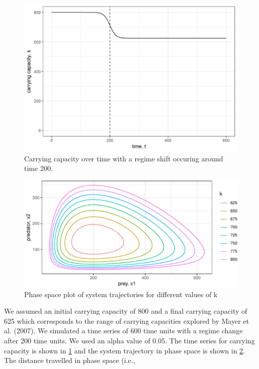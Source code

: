 \documentclass[12pt,twoside,openany]{reedthesis}
\begin{document}
\begin{figure}

{\centering \includegraphics[width=0.85\linewidth]{./chapterFiles/fiGuide/figures/kByTime} 

}

\caption{Carrying capacity over time with a regime shift occuring around time 200.}\label{fig:kByTime}
\end{figure}\begin{figure}
{\centering \includegraphics[width=0.85\linewidth]{_myDissertation_files/figure-latex/kTrajectories-1} 

}

\caption{Phase space plot of system trajectories for different values of k}\label{fig:kTrajectories}
\end{figure}
We assumed an initial carrying capacity of 800 and a final carrying
capacity of 625 which corresponds to the range of carrying capacities
explored by Mayer et al. (2007). We simulated a time series of 600 time
units with a regime change after 200 time units. We used an alpha value
of 0.05. The time series for carrying capacity is shown in
\ref{fig:kByTime} and the system trajectory in phase space is shown in
\ref{fig:kTrajectories}. The distance travelled in phase space (i.e.,
\end{document}
